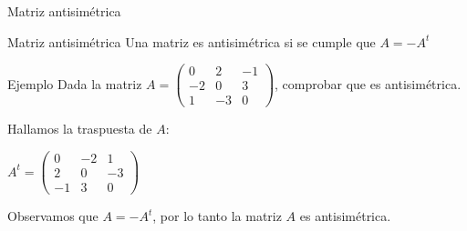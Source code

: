 \documentclass[9pt]{beamer}
\begin{document}
\begin{frame}{Matriz antisimétrica}
\begin{alertblock}{Matriz antisimétrica}
Una matriz es antisimétrica si se cumple que $A=-A^t$
\end{alertblock}

\begin{exampleblock}{Ejemplo}
Dada la matriz $A=\begin{pmatrix} 0 & 2 & -1 \\ -2 & 0 & 3 \\ 1 & -3 & 0 \end{pmatrix}$, comprobar que es antisimétrica.
\end{exampleblock}

Hallamos  la traspuesta de $A$:

$A^t = \begin{pmatrix} 0 & -2 & 1 \\ 2 & 0 & -3 \\ -1 & 3 & 0 \end{pmatrix}$

Observamos que $A=-A^t$, por lo tanto la matriz $A$ es antisimétrica.
\end{frame}
\end{document}
